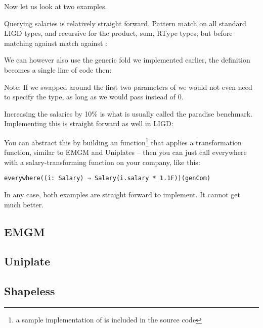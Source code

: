 

Now let us look at two examples.

\begin{example}

Querying salaries is relatively straight forward. Pattern match on all standard
LIGD types, and recursive for the product, sum, RType types; but before matching
against  match against :



We can however also use the generic fold we implemented earlier, the definition
becomes a single line of code then:



Note: If we swapped around the first two parameters of  we would not even
need to specify the  type, as long as we would pass  instead
of 0.

\end{example}

\begin{example}

Increasing the salaries by 10\% is what is usually called the paradise
benchmark. Implementing this is straight forward as well in LIGD:



You can abstract this by building an  function\footnote{a sample implementation of  is included in the source code} that applies
a transformation function, similar to EMGM and Uniplates  -- then
you can just call everywhere with a salary-transforming function on your company,
like this:
\begin{lstlisting}[caption=Increase the salaries using \cd{everywhere}]
  everywhere((i: Salary) ⇒ Salary(i.salary * 1.1F))(genCom)
\end{lstlisting}

\end{example}

In any case, both examples are straight forward to implement. It cannot get
much better.


\subsection{EMGM}

\subsection{Uniplate}

\subsection{Shapeless}
